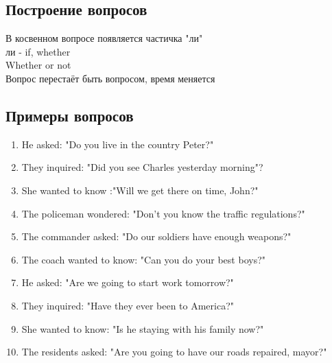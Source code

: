 \subsection{Построение вопросов}
\p
В косвенном вопросе появляется частичка "ли"\\
ли - if, whether\\
Whether or not\\
Вопрос перестаёт быть вопросом, время меняется

\subsection{Примеры вопросов}
\p
\begin{enumerate}
    \item He asked: "Do you live in the country Peter?"\\
    \item They inquired: "Did you see Charles yesterday morning"?\\
    \item She wanted to know :"Will we get there on time, John?"\\
    \item The policeman wondered: "Don't you know the traffic regulations?"\\
    \item The commander asked: "Do our soldiers have enough weapons?"\\
    \item The coach wanted to know: "Can you do your best boys?"\\
    \item He asked: "Are we going to start work tomorrow?"\\
    \item They inquired: "Have they ever been to America?"\\
    \item She wanted to know: "Is he staying with his family now?"\\
    \item The residents asked: "Are you going to have our roads repaired, mayor?"\\
\end{enumerate}

